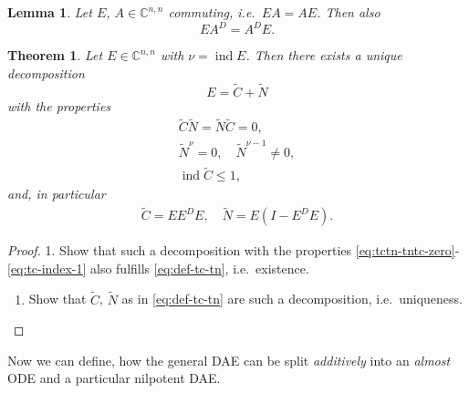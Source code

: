 \documentclass[]{book}
\providecommand{\tightlist}{%
  \setlength{\itemsep}{0pt}\setlength{\parskip}{0pt}}
\newtheorem{theorem}{Theorem}[chapter]
\newtheorem{lemma}{Lemma}[chapter]
\theoremstyle{definition}
\theoremstyle{definition}
\theoremstyle{definition}
\theoremstyle{definition}
\theoremstyle{remark}
\begin{document}
\begin{lemma}
\protect\hypertarget{lem:ae-commute-ade-commute}{}{\label{lem:ae-commute-ade-commute} }Let \(E\), \(A \in \mathbb C^{n,n}\) commuting, i.e.~\(EA=AE\). Then also
\begin{equation}
EA^D = A^DE. \label{eq:commute-ea-ead-ade}
\end{equation}
\end{lemma}

\begin{theorem}
\protect\hypertarget{thm:decomposition-e-cpn}{}{\label{thm:decomposition-e-cpn} }Let \(E\in \mathbb C^{n,n}\) with \(\nu = \operatorname{ind}E\). Then there exists a unique decomposition
\[
E=\tilde C + \tilde N
\]
with the properties
\begin{align}
\tilde C \tilde N = \tilde N \tilde C = 0, \label{eq:tctn-tntc-zero} \\
\tilde N^\nu = 0, \quad \tilde N^{\nu-1} \neq 0, \label{eq:tn-nilpotent}\\
\operatorname{ind}\tilde C \leq 1, \label{eq:tc-index-1}
\end{align}
and, in particular
\begin{align}
\tilde C = EE^DE, \quad \tilde N = E(I - E^DE). \label{eq:def-tc-tn}
\end{align}
\end{theorem}

\begin{proof}
{}
1. Show that such a decomposition with the properties \eqref{eq:tctn-tntc-zero}-\eqref{eq:tc-index-1} also fulfills \eqref{eq:def-tc-tn}, i.e.~existence.

\begin{enumerate}
\def\labelenumi{\arabic{enumi}.}
\setcounter{enumi}{1}
\tightlist
\item
  Show that \(\tilde C\), \(\tilde N\) as in \eqref{eq:def-tc-tn} are such a decomposition, i.e.~uniqueness.
\end{enumerate}
\end{proof}

Now we can define, how the general DAE can be split \emph{additively} into an \emph{almost} ODE and a particular nilpotent DAE.
\end{document}

